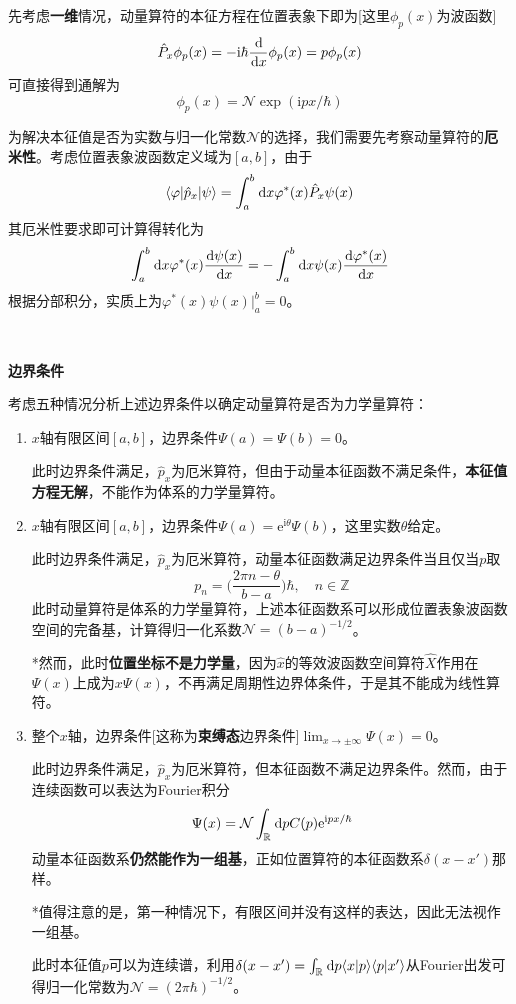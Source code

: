 \documentclass[a4paper,UTF8,fontset=windows]{ctexart}
\newcommand*{\dr}{\hspace{0.07em}\mathrm{d}}
\newcommand*{\ir}{\mathrm{i}}
\newcommand*{\er}{\mathrm{e}}
\newcommand*{\bk}[2]{\langle#1|#2\rangle}
\newcommand*{\blk}[3]{\langle#1|#2|#3\rangle}
\begin{document}
先考虑\textbf{一维}情况，动量算符的本征方程在位置表象下即为[这里$\phi_p(x)$为波函数]
$$\hat{P}_x\phi_p(x)=-\ir\hbar\frac{\dr}{\dr x}\phi_p(x)=p\phi_p(x)$$
可直接得到通解为
$$\phi_p(x)=\mathcal{N}\exp(\ir px/\hbar)$$

为解决本征值是否为实数与归一化常数$\mathcal{N}$的选择，我们需要先考察动量算符的\textbf{厄米性}。考虑位置表象波函数定义域为$[a,b]$，由于
$$\blk{\varphi}{\hat{p}_x}{\psi}=\int_a^b\dr x\varphi^*(x)\hat{P}_x\psi(x)$$
其厄米性要求即可计算得转化为
$$\int_a^b\dr x\varphi^*(x)\frac{\dr\psi(x)}{\dr x}=-\int_a^b\dr x\psi(x)\frac{\dr\varphi^*(x)}{\dr x}$$
根据分部积分，实质上为$\varphi^*(x)\psi(x)\big|^b_a=0$。

\

\textbf{边界条件}

考虑五种情况分析上述边界条件以确定动量算符是否为力学量算符：
\begin{enumerate}
    \item $x$轴有限区间$[a,b]$，边界条件$\Psi(a)=\Psi(b)=0$。
    
    此时边界条件满足，$\hat{p}_x$为厄米算符，但由于动量本征函数不满足条件，\textbf{本征值方程无解}，不能作为体系的力学量算符。

    \item $x$轴有限区间$[a,b]$，边界条件$\Psi(a)=\er^{\ir\theta}\Psi(b)$，这里实数$\theta$给定。

    此时边界条件满足，$\hat{p}_x$为厄米算符，动量本征函数满足边界条件当且仅当$p$取
    $$p_n=\bigg(\frac{2\pi n-\theta}{b-a}\bigg)\hbar,\quad n\in\mathbb{Z}$$
    此时动量算符是体系的力学量算符，上述本征函数系可以形成位置表象波函数空间的完备基，计算得归一化系数$\mathcal{N}=(b-a)^{-1/2}$。

    *然而，此时\textbf{位置坐标不是力学量}，因为$\hat{x}$的等效波函数空间算符$\hat{X}$作用在$\Psi(x)$上成为$x\Psi(x)$，不再满足周期性边界体条件，于是其不能成为线性算符。

    \item 整个$x$轴，边界条件[这称为\textbf{束缚态}边界条件]$\lim_{x\to\pm\infty}\Psi(x)=0$。
    
    此时边界条件满足，$\hat{p}_x$为厄米算符，但本征函数不满足边界条件。然而，由于连续函数可以表达为Fourier积分
    $$\Psi(x)=\mathcal{N}\int_\mathbb{R}\dr pC(p)\er^{\ir px/\hbar}$$
    动量本征函数系\textbf{仍然能作为一组基}，正如位置算符的本征函数系$\delta(x-x')$那样。

    *值得注意的是，第一种情况下，有限区间并没有这样的表达，因此无法视作一组基。

    此时本征值$p$可以为连续谱，利用$\delta(x-x')=\int_\mathbb{R}\dr p\bk{x}{p}\bk{p}{x'}$从Fourier出发可得归一化常数为$\mathcal{N}=(2\pi\hbar)^{-1/2}$。


\end{enumerate}
\end{document}

